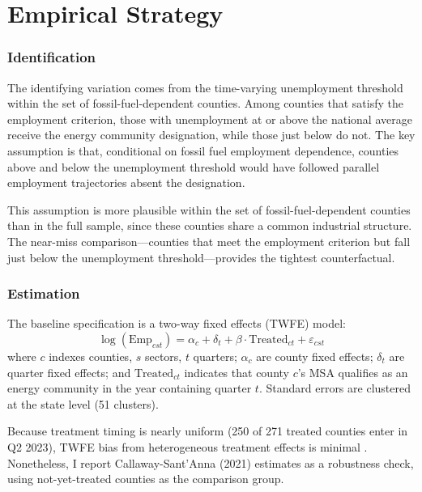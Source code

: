 \documentclass[12pt]{article}
\begin{document}



\section{Empirical Strategy}
\label{sec:strategy}

\subsubsection*{Identification}
The identifying variation comes from the time-varying unemployment threshold within the set of fossil-fuel-dependent counties. Among counties that satisfy the employment criterion, those with unemployment at or above the national average receive the energy community designation, while those just below do not. The key assumption is that, conditional on fossil fuel employment dependence, counties above and below the unemployment threshold would have followed parallel employment trajectories absent the designation.

This assumption is more plausible within the set of fossil-fuel-dependent counties than in the full sample, since these counties share a common industrial structure. The near-miss comparison---counties that meet the employment criterion but fall just below the unemployment threshold---provides the tightest counterfactual.

\subsubsection*{Estimation}
The baseline specification is a two-way fixed effects (TWFE) model:
\begin{equation}
\log(\text{Emp}_{cst}) = \alpha_c + \delta_t + \beta \cdot \text{Treated}_{ct} + \varepsilon_{cst}
\label{eq:twfe}
\end{equation}
where $c$ indexes counties, $s$ sectors, $t$ quarters; $\alpha_c$ are county fixed effects; $\delta_t$ are quarter fixed effects; and $\text{Treated}_{ct}$ indicates that county $c$'s MSA qualifies as an energy community in the year containing quarter $t$. Standard errors are clustered at the state level (51 clusters).

Because treatment timing is nearly uniform (250 of 271 treated counties enter in Q2 2023), TWFE bias from heterogeneous treatment effects is minimal \citep{deChaisemartin2020, GoodmanBacon2021}. Nonetheless, I report Callaway-Sant'Anna (2021) estimates as a robustness check, using not-yet-treated counties as the comparison group.
\end{document}
